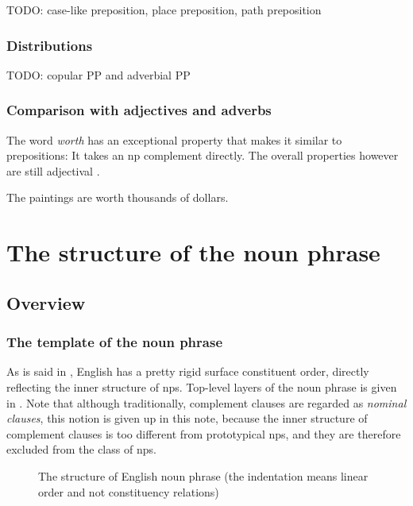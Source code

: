 \documentclass[UTF8, a4paper, oneside, scheme=plain]{ctexrep}
\newcommand*{\citepage}[1]{p.~{#1}}
\newcommand*{\term}[1]{\emph{#1}}
\newcommand{\corpus}[1]{\emph{#1}}
\begin{document}
TODO: case-like preposition, place preposition, path preposition \citet{spatialpp}

\subsection{Distributions}

TODO: copular PP and adverbial PP

\subsection{Comparison with adjectives and adverbs}

The word \corpus{worth} has an exceptional property
that makes it similar to prepositions:
It takes an \acs{np} complement directly.
The overall properties however are still adjectival \citep[\citepage{607}]{cgel}.

\begin{exe}
    \ex The paintings are worth thousands of dollars.
\end{exe}

\chapter{The structure of the noun phrase}\label{chap:np}

\section{Overview}

\subsection{The template of the noun phrase}

As is said in ,
English has a pretty rigid surface constituent order,
directly reflecting the inner structure of \acs{np}s.
Top-level layers of the noun phrase is given in .
Note that although traditionally, complement clauses are regarded as \term{nominal clauses},
this notion is given up in this note,
because the inner structure of complement clauses is too different from prototypical \acs{np}s,
and they are therefore excluded from the class of \acs{np}s.

\begin{figure}[H]
    \centering
    
    \caption{The structure of English noun phrase (the indentation means linear order and not constituency relations)}
    \label{fig:np-template}
\end{figure}
\end{document}

